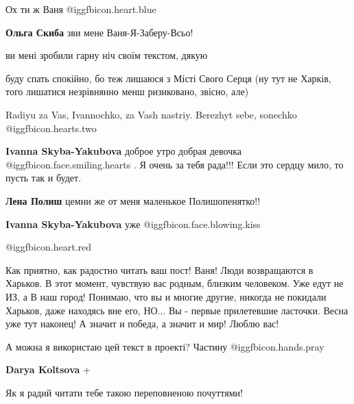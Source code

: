  
 
 
 
 
\zzSecCmt

\begin{itemize} %
Ох ти ж Ваня  @igg{fbicon.heart.blue} 

\textbf{Ольга Скиба} зви мене Ваня-Я-Заберу-Всьо!


ви мені зробили гарну ніч своїм текстом, дякую

буду спать спокійно, бо теж лишаюся з Місті Свого Серця (ну тут не Харків, того
лишатися незрівнянно менш ризиковано, звісно, але)

Radiyu za Vas, Ivannochko, za Vash nastriy. Berezhyt sebe, sonechko @igg{fbicon.hearts.two} 

\textbf{Ivanna Skyba-Yakubova} доброе утро добрая девочка  @igg{fbicon.face.smiling.hearts} . Я очень за тебя рада!!! Если это сердцу мило, то пусть так и будет.

\textbf{Лена Полиш} цемни же от меня маленькое Полишопенятко!!

\textbf{Ivanna Skyba-Yakubova} уже @igg{fbicon.face.blowing.kiss} 

@igg{fbicon.heart.red}


Как приятно, как радостно читать ваш пост! Ваня! Люди возвращаются в Харьков. В
этот момент, чувствую вас родным, близким человеком. Уже едут не ИЗ, а В наш
город! Понимаю, что вы и многие другие, никогда не покидали Харьков, даже
находясь вне его, НО... Вы - первые прилетевшие ласточки. Весна уже тут
наконец! А значит и победа, а значит и мир! Люблю вас!

А можна я використаю цей текст в проекті? Частину  @igg{fbicon.hands.pray}

\textbf{Darya Koltsova} +

Як я радий читати тебе такою переповненою почуттями!


\end{itemize}
